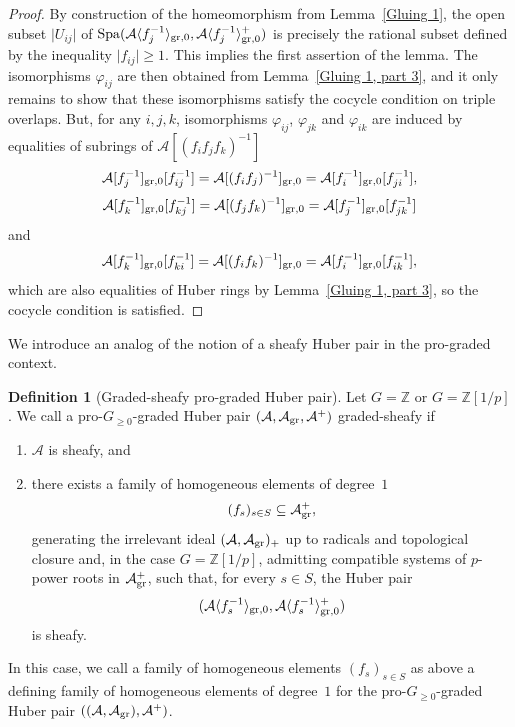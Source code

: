 \documentclass[12pt,twoside,a4paper]{article}
\theoremstyle{definition}
\newtheorem{mydef}[thm]{Definition}
\theoremstyle{remark}
\newcommand\gr{{\rm gr}}
\newcommand\Spa{{\rm Spa}}
\begin{document}
\begin{proof}By construction of the homeomorphism from Lemma~\ref{Gluing 1}, the open subset $\vert U_{ij}\vert$ of $\Spa(\mathcal{A}\langle f_{j}^{-1}\rangle_{\gr,0}, \mathcal{A}\langle f_{j}^{-1}\rangle_{\gr,0}^{+})$ is precisely the rational subset defined by the inequality $\vert f_{ij}\vert\geq1$. This implies the first assertion of the lemma. The isomorphisms $\varphi_{ij}$ are then obtained from Lemma~\ref{Gluing 1, part 3}, and it only remains to show that these isomorphisms satisfy the cocycle condition on triple overlaps. But, for any $i, j, k$, isomorphisms $\varphi_{ij}$, $\varphi_{jk}$ and $\varphi_{ik}$ are induced by equalities of subrings of $\mathcal{A}[(f_{i}f_{j}f_{k})^{-1}]$ \begin{equation*}\mathcal{A}[f_{j}^{-1}]_{\gr,0}[f_{ij}^{-1}]=\mathcal{A}[(f_{i}f_{j})^{-1}]_{\gr,0}=\mathcal{A}[f_{i}^{-1}]_{\gr,0}[f_{ji}^{-1}],\end{equation*}\begin{equation*}\mathcal{A}[f_{k}^{-1}]_{\gr,0}[f_{kj}^{-1}]=\mathcal{A}[(f_{j}f_{k})^{-1}]_{\gr,0}=\mathcal{A}[f_{j}^{-1}]_{\gr,0}[f_{jk}^{-1}]\end{equation*}and\begin{equation*}\mathcal{A}[f_{k}^{-1}]_{\gr,0}[f_{ki}^{-1}]=\mathcal{A}[(f_{i}f_{k})^{-1}]_{\gr,0}=\mathcal{A}[f_{i}^{-1}]_{\gr,0}[f_{ik}^{-1}],\end{equation*}which are also equalities of Huber rings by Lemma~\ref{Gluing 1, part 3}, so the cocycle condition is satisfied. \end{proof}
We introduce an analog of the notion of a sheafy Huber pair in the pro-graded context. 
\begin{mydef}[Graded-sheafy pro-graded Huber pair]\label{Sheafy}Let $G=\mathbb{Z}$ or $G=\mathbb{Z}[1/p]$. We call a pro-$G_{\geq0}$-graded Huber pair $(\mathcal{A}, \mathcal{A}_{\gr}, \mathcal{A}^{+})$ graded-sheafy if \begin{enumerate}[(1)]\item $\mathcal{A}$ is sheafy, and \item there exists a family of homogeneous elements of degree~$1$  \begin{equation*}(f_{s})_{s\in S}\subseteq \mathcal{A}_{\gr}^{+},\end{equation*}generating the irrelevant ideal $(\mathcal{A}, \mathcal{A}_{\gr})_{+}$ up to radicals and topological closure and, in the case $G=\mathbb{Z}[1/p]$, admitting compatible systems of $p$-power roots in $\mathcal{A}_{\gr}^{+}$, such that, for every $s\in S$, the Huber pair \begin{equation*}(\mathcal{A}\langle f_{s}^{-1}\rangle_{\gr, 0}, \mathcal{A}\langle f_{s}^{-1}\rangle_{\gr, 0}^{+})\end{equation*}is sheafy. \end{enumerate}In this case, we call a family of homogeneous elements $(f_{s})_{s\in S}$ as above a defining family of homogeneous elements of degree~$1$ for the pro-$G_{\geq0}$-graded Huber pair $((\mathcal{A}, \mathcal{A}_{\gr}), \mathcal{A}^{+})$. \end{mydef}
\end{document}
